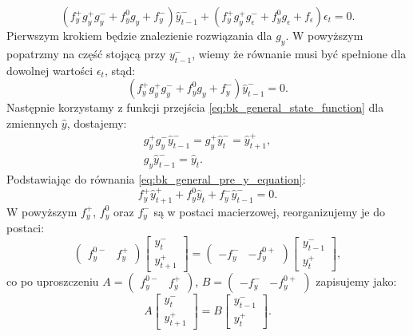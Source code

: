 \begin{equation}
    \label{eqn:genericBkMainEq}
    (f_y^+ g_y^+ g_y^- + f_y^0 g_y + f_y^-) \hat{y}^-_{t-1} + (f_y^+ g_y^+ g_\epsilon^- + f_y^0 g_\epsilon + f_\epsilon) \epsilon_t = 0.
\end{equation}
Pierwszym krokiem będzie znalezienie rozwiązania dla $g_y$. W powyższym popatrzmy na część stojącą przy $y^-_{t-1}$, wiemy że równanie musi być spełnione dla dowolnej wartości $\epsilon_t$, stąd:
\begin{equation}
    \label{eq:bk_general_pre_y_equation}
    (f_y^+ g_y^+ g_y^- + f_y^0 g_y + f_y^-)\hat{y}^-_{t-1} = 0.
\end{equation}
Następnie korzystamy z funkcji przejścia \eqref{eq:bk_general_state_function} dla zmiennych $\hat{y}$, dostajemy:
\begin{gather}
    g_y^+ g_y^- \hat{y}^-_{t-1} = g_y^+\hat{y}^-_{t} = \hat{y}^+_{t+1}, \\
    g_y \hat{y}^-_{t-1} = \hat{y}_t.
\end{gather}
Podstawiając do równania \eqref{eq:bk_general_pre_y_equation}:
\begin{equation}
    \label{eqn:genericBkGy}
    f_y^+ \hat{y}^+_{t+1} + f_y^0 \hat{y}_t + f_y^- \hat{y}^-_{t-1} = 0.
\end{equation}
W powyższym $f_y^+$, $f_y^0$ oraz $f_y^-$ są w postaci macierzowej, reorganizujemy je do postaci:
\begin{equation}
    \label{eqn:genBkMatrixGy}
    \begin{pmatrix}
        f_y^{0-} & f_y^+
    \end{pmatrix}
    \begin{bmatrix}
        y_t^- \\
        y_{t+1}^+
    \end{bmatrix} = 
        \begin{pmatrix}
        -f_y^{-} & -f_y^{0+}
    \end{pmatrix}
    \begin{bmatrix}
        y_{t-1}^- \\
        y_{t}^+
    \end{bmatrix},
\end{equation}
co po uproszczeniu $A = \begin{pmatrix}f_y^{0-} & f_y^+\end{pmatrix}$, $B = \begin{pmatrix} -f_y^{-} & -f_y^{0+}\end{pmatrix}$ zapisujemy jako:
\begin{equation}
    A
    \begin{bmatrix}
        y_t^- \\
        y_{t+1}^+
    \end{bmatrix} = 
    B
    \begin{bmatrix}
        y_{t-1}^- \\
        y_{t}^+
    \end{bmatrix}.
\end{equation}
